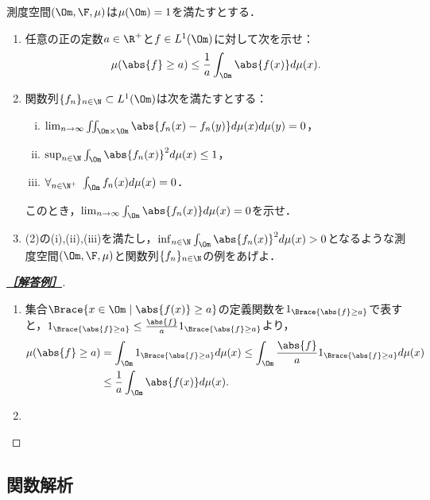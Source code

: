 \documentclass[uplatex,dvipdfmx]{jsarticle}
\begin{document}
\begin{tcolorbox}[colframe=ForestGreen, colback=ForestGreen!10!white,breakable,colbacktitle=ForestGreen!40!white,coltitle=black,fonttitle=\bfseries\sffamily,
    title=B 第10問（実解析）]
    測度空間$(\Om,\F,\mu)$は$\mu(\Om)=1$を満たすとする．
    \begin{enumerate}
        \item 任意の正の定数$a\in\R^+$と$f\in L^1(\Om)$に対して次を示せ：
        \[\mu(\abs{f}\ge a)\le\frac{1}{a}\int_\Om\abs{f(x)}d\mu(x).\]
        \item 関数列$\{f_n\}_{n\in\N}\subset L^1(\Om)$は次を満たすとする：
        \begin{enumerate}[(i)]
            \item $\lim_{n\to\infty}\iint_{\Om\times\Om}\abs{f_n(x)-f_n(y)}d\mu(x)d\mu(y)=0$，
            \item $\sup_{n\in\N}\int_\Om\abs{f_n(x)}^2d\mu(x)\le 1$，
            \item $\forall_{n\in\N^+}\;\int_\Om f_n(x)d\mu(x)=0$．
        \end{enumerate}
        このとき，$\lim_{n\to\infty}\int_\Om\abs{f_n(x)}d\mu(x)=0$を示せ．
        \item (2)の(i),(ii),(iii)を満たし，$\inf_{n\in\N}\int_\Om\abs{f_n(x)}^2d\mu(x)>0$となるような測度空間$(\Om,\F,\mu)$と関数列$\{f_n\}_{n\in\N}$の例をあげよ．
    \end{enumerate}
\end{tcolorbox}
\begin{proof}[\textbf{\underline{［解答例］}}]\mbox{}
    \begin{enumerate}
        \item 集合$\Brace{x\in\Om\mid\abs{f(x)}\ge a}$の定義関数を$1_{\Brace{\abs{f}\ge a}}$で表すと，$1_{\Brace{\abs{f}\ge a}}\le\frac{\abs{f}}{a}1_{\Brace{\abs{f}\ge a}}$より，
        \begin{align*}
            \mu(\abs{f}\ge a)&=\int_\Om 1_{\Brace{\abs{f}\ge a}}d\mu(x)\le\int_\Om\frac{\abs{f}}{a}1_{\Brace{\abs{f}\ge a}}d\mu(x)\\
            &\le\frac{1}{a}\int_\Om\abs{f(x)}d\mu(x).
        \end{align*}
        \item 
    \end{enumerate}
\end{proof}

\subsection{関数解析}
\end{document}
